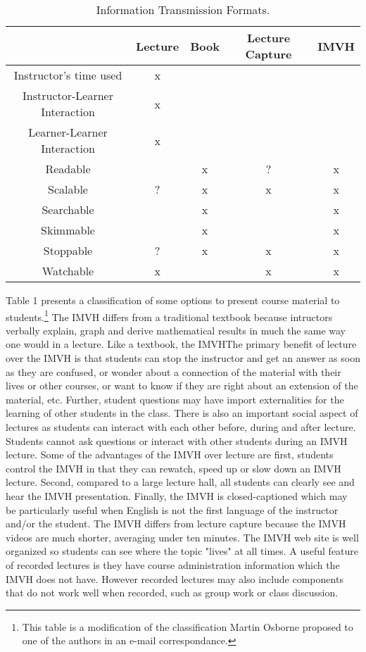 \documentclass[12pt]{article}
\begin{document}
\begin{table}
	\caption{Information Transmission Formats.}
	\centering
	\begin{tabular}{c|c|c|c|c}
		\hline
		& Lecture & Book & Lecture Capture & IMVH\\
		\hline
		Instructor's time used & x & & &\\
		Instructor-Learner Interaction & x & & &\\
		Learner-Learner Interaction & x & & & \\
		Readable & & x & ? & x \\
		Scalable & ? & x & x & x\\
		Searchable & & x & & x \\
		Skimmable & & x & & x\\
		Stoppable & ? & x & x & x\\
		Watchable & x & & x & x\\

		\hline

	\end{tabular}
	\label{infotransmission}
\end{table}

Table 1 presents a classification of some options to present course material to students.\footnote{This table is a modification of the classification Martin Osborne proposed to one of the authors in an e-mail correspondance.} The IMVH differs from a traditional textbook because intructors verbally explain, graph and derive mathematical results in much the same way one would in a lecture. Like a textbook, the IMVHThe primary benefit of lecture over the IMVH is that students can stop the instructor and get an answer as soon as they are confused, or wonder about a connection of the material with their lives or other courses, or want to know if they are right about an extension of the material, etc. Further, student questions may have import externalities for the learning of other students in the class.  There is also an important social aspect of lectures as students can interact with each other before, during and after lecture. Students cannot ask questions or interact with other students during an IMVH lecture.  Some of the advantages of the IMVH over lecture are first, students control the IMVH in that they can rewatch, speed up or slow down an IMVH lecture. Second, compared to a large lecture hall, all students can clearly see and hear the IMVH presentation. Finally, the IMVH is closed-captioned which may be particularly useful when English is not the first language of the instructor and/or the student. The IMVH differs from lecture capture because the IMVH videos are much shorter, averaging under ten minutes.  The IMVH web site is well organized so students can see where the topic "lives" at all times. A useful feature of recorded lectures is they have course administration information which the IMVH does not have. However recorded lectures may also include components that do not work well when recorded, such as group work or class discussion. 
\end{document}
